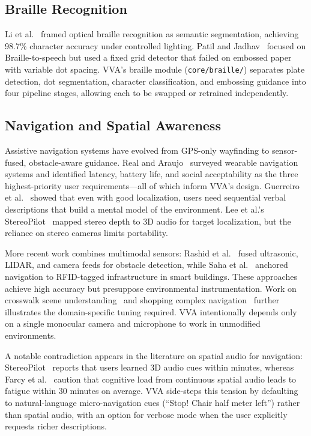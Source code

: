 \subsection{Braille Recognition}

Li et al.~\cite{li2020optical_braille} framed optical braille recognition as semantic segmentation, achieving 98.7\% character accuracy under controlled lighting. Patil and Jadhav~\cite{braille_tts_conversion2021} focused on Braille-to-speech but used a fixed grid detector that failed on embossed paper with variable dot spacing. VVA's braille module (\texttt{core/braille/}) separates plate detection, dot segmentation, character classification, and embossing guidance into four pipeline stages, allowing each to be swapped or retrained independently.

\subsection{Navigation and Spatial Awareness}

Assistive navigation systems have evolved from GPS-only wayfinding to sensor-fused, obstacle-aware guidance. Real and Araujo~\cite{sensors_wearable_navigation2018} surveyed wearable navigation systems and identified latency, battery life, and social acceptability as the three highest-priority user requirements---all of which inform VVA's design. Guerreiro et al.~\cite{outdoor_navigation_vi2022} showed that even with good localization, users need sequential verbal descriptions that build a mental model of the environment. Lee et al.'s StereoPilot~\cite{stereopilot_wearable2023} mapped stereo depth to 3D audio for target localization, but the reliance on stereo cameras limits portability.

More recent work combines multimodal sensors: Rashid et al.~\cite{multimodality_obstacle_nav2023} fused ultrasonic, LIDAR, and camera feeds for obstacle detection, while Saha et al.~\cite{infrastructure_guided_nav2021} anchored navigation to RFID-tagged infrastructure in smart buildings. These approaches achieve high accuracy but presuppose environmental instrumentation. Work on crosswalk scene understanding~\cite{dynamic_crosswalk2022} and shopping complex navigation~\cite{supporting_navigation_shopping2022} further illustrates the domain-specific tuning required. VVA intentionally depends only on a single monocular camera and microphone to work in unmodified environments.

A notable contradiction appears in the literature on spatial audio for navigation: StereoPilot~\cite{stereopilot_wearable2023} reports that users learned 3D audio cues within minutes, whereas Farcy et al.~\cite{tools_tech_blind_nav_review2023} caution that cognitive load from continuous spatial audio leads to fatigue within 30 minutes on average. VVA side-steps this tension by defaulting to natural-language micro-navigation cues (``Stop! Chair half meter left'') rather than spatial audio, with an option for verbose mode when the user explicitly requests richer descriptions.

